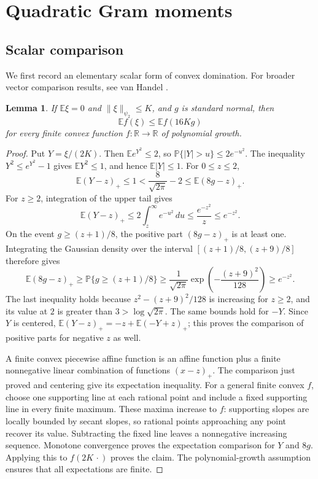 \documentclass[11pt]{article}
\newtheorem{lemma}[theorem]{Lemma}
\newcommand{\R}{\mathbb R}
\newcommand{\E}{\mathbb E}
\newcommand{\Prob}{\mathbb P}
\begin{document}
\section{Quadratic Gram moments}\label{sec:moments}

\subsection{Scalar comparison}

We first record an elementary scalar form of convex domination.
For broader vector comparison results, see van Handel \cite{vanHandel}.

\begin{lemma}\label{lem:convex}
If \(\E\xi=0\) and \(\|\xi\|_{\psi_2}\le K\), and \(g\) is standard
normal, then
\[
 \E f(\xi)\le\E f(16K g)
\]
for every finite convex function \(f:\R\to\R\) of polynomial growth.
\end{lemma}

\begin{proof}
Put \(Y=\xi/(2K)\). Then \(\E e^{Y^2}\le2\), so
\(\Prob\{|Y|>u\}\le2e^{-u^2}\). The inequality
\(Y^2\le e^{Y^2}-1\) gives \(\E Y^2\le1\), and hence
\(\E|Y|\le1\).
For \(0\le z\le2\),
\[
 \E(Y-z)_+\le1
 <\frac8{\sqrt{2\pi}}-2
 \le\E(8g-z)_+.
\]
For \(z\ge2\), integration of the upper tail gives
\[
 \E(Y-z)_+\le2\int_z^\infty e^{-u^2}\,du
 \le\frac{e^{-z^2}}{z}\le e^{-z^2}.
\]
On the event \(g\ge(z+1)/8\), the positive part \((8g-z)_+\) is
at least one. Integrating the Gaussian density over the interval
\([(z+1)/8,(z+9)/8]\) therefore gives
\[
 \E(8g-z)_+
 \ge\Prob\{g\ge(z+1)/8\}
 \ge\frac1{\sqrt{2\pi}}\exp\!\left(-\frac{(z+9)^2}{128}\right)
 \ge e^{-z^2}.
\]
The last inequality holds because
\(z^2-(z+9)^2/128\) is increasing for \(z\ge2\), and its value
at \(2\) is greater than \(3>\log\sqrt{2\pi}\).
The same bounds hold for \(-Y\). Since \(Y\) is centered,
\(\E(Y-z)_+=-z+\E(-Y+z)_+\); this proves the comparison of
positive parts for negative \(z\) as well.

A finite convex piecewise affine function is an affine function plus
a finite nonnegative linear combination of functions \((x-z)_+\).
The comparison just proved and centering give its expectation inequality.
For a general finite convex \(f\), choose one supporting line at each
rational point and include a fixed supporting line in every finite
maximum. These maxima increase to \(f\): supporting slopes are locally
bounded by secant slopes, so rational points approaching any point
recover its value. Subtracting the fixed line leaves a nonnegative
increasing sequence. Monotone convergence proves the expectation
comparison for \(Y\) and \(8g\). Applying this to \(f(2K\,\cdot)\)
proves the claim. The polynomial-growth assumption ensures that all
expectations are finite.
\end{proof}
\end{document}
